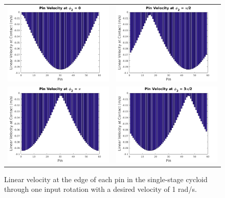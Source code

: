 \begin{figure}[t]
   \centering
   \begin{tabular}{cc}
	   \includegraphics[width=0.48\linewidth]{fig/single_vel_0pi} &
	   \includegraphics[width=0.48\linewidth]{fig/single_vel_pi_2} \\
	   \includegraphics[width=0.48\linewidth]{fig/single_vel_pi} &
	   \includegraphics[width=0.48\linewidth]{fig/single_vel_3pi2}
   \end{tabular}
   \caption{Linear velocity at the edge of each pin in the single-stage cycloid through one input rotation with a desired velocity of 1 rad/s.}
   \label{fig:single_sliding}
\end{figure}

